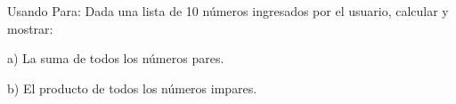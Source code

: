 ﻿
Usando Para: Dada una lista de 10 números ingresados por el usuario, calcular y mostrar:

a) La suma de todos los números pares.

b) El producto de todos los números impares.


\newpage
{}

\volverindice
\newpage
